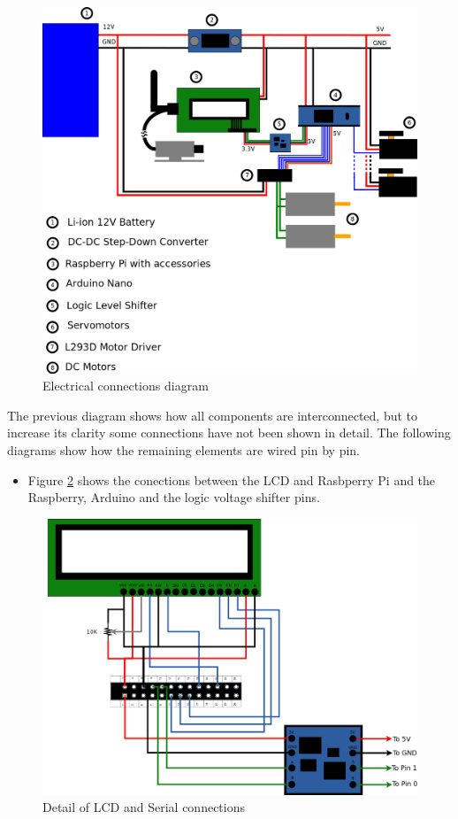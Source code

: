 	\begin{figure}[H]
			\centering
			\includegraphics[width=15cm, angle=0]{images/Diagrams/electrical.png}
			\caption{Electrical connections diagram }
			\label{electricDiagram}
	\end{figure}
	\bigskip
	
\bigskip


The previous diagram shows how all components are interconnected, but to increase its clarity some connections have not been shown in detail. The following diagrams show how the remaining elements are wired pin by pin.

	\begin{itemize}
	\item Figure \ref{gpioDetail} shows the conections between the LCD and Rasbperry Pi and the Raspberry, Arduino and the logic voltage shifter pins.
	\end{itemize}

	\begin{figure}[H]
			\centering
			\includegraphics[width=15cm, angle=0]{images/Diagrams/detail.png}
			\caption{Detail of LCD and Serial connections }
			\label{gpioDetail}
	\end{figure}
	\bigskip


